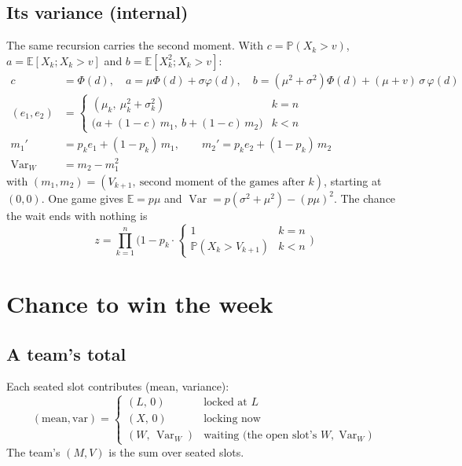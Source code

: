 \documentclass[10pt]{article}
\newcommand{\E}{\mathbb{E}}
\renewcommand{\Pr}{\mathbb{P}}
\DeclareMathOperator{\Var}{Var}
\begin{document}
\subsection{Its variance (internal)}
The same recursion carries the second moment. With $c=\Pr(X_k>v)$, $a=\E[X_k;X_k>v]$ and $b=\E[X_k^2;X_k>v]$:
\begin{align}
c &= \Phi(d),\quad a=\mu\Phi(d)+\sigma\varphi(d),\quad b=(\mu^2+\sigma^2)\Phi(d)+(\mu+v)\,\sigma\,\varphi(d)\\
(e_1,e_2) &= \begin{cases}(\mu_k,\ \mu_k^2+\sigma_k^2) & k=n\\ \big(a+(1-c)\,m_1,\ b+(1-c)\,m_2\big) & k<n\end{cases}\\
m_1' &= p_k e_1 + (1-p_k)\,m_1,\qquad m_2' = p_k e_2 + (1-p_k)\,m_2\\
\Var_W &= m_2 - m_1^2
\end{align}
with $(m_1,m_2)=(V_{k+1},\ \text{second moment of the games after } k)$, starting at $(0,0)$. One game gives
$\E=p\mu$ and $\Var=p(\sigma^2+\mu^2)-(p\mu)^2$. The chance the wait ends with nothing is
\begin{equation}
z=\prod_{k=1}^{n}\Big(1-p_k\cdot\begin{cases}1 & k=n\\ \Pr(X_k>V_{k+1}) & k<n\end{cases}\Big)
\end{equation}

\section{Chance to win the week}
\subsection{A team's total}
Each seated slot contributes (mean, variance):
\begin{equation}
(\text{mean},\text{var})=\begin{cases}(L,\,0) & \text{locked at } L\\ (X,\,0) & \text{locking now}\\ (W,\,\Var_W) & \text{waiting (the open slot's } W,\Var_W)\end{cases}
\end{equation}
The team's $(M,V)$ is the sum over seated slots.
\end{document}
